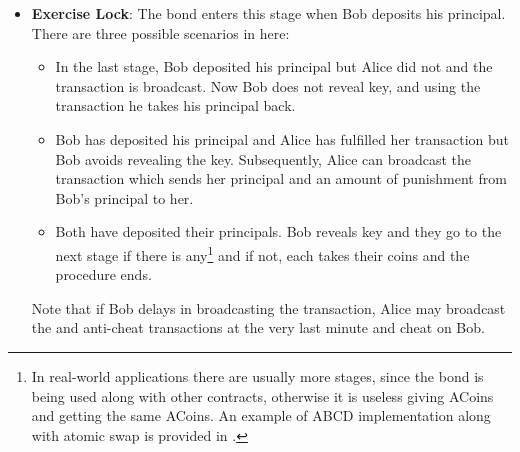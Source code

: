 \begin{itemize}
    \item \textbf{Exercise Lock}: The bond enters this stage when Bob deposits his principal. There are three possible scenarios in here:
    \begin{itemize}
        \item In the last stage, Bob deposited his principal but Alice did not and the  transaction is broadcast. Now Bob does not reveal \keyone key, and using the  transaction he takes his principal back.
        
        \item Bob has deposited his principal and Alice has fulfilled her  transaction but Bob avoids revealing the \keyone key. Subsequently, Alice can broadcast the  transaction which sends her principal and an amount of punishment from Bob's principal to her. 
        
        \item Both have deposited their principals. Bob reveals \keyone key and they go to the next stage if there is any\footnote{In real-world applications there are usually more stages, since the bond is being used along with other contracts, otherwise it is useless giving ACoins and getting the same ACoins. An example of ABCD implementation along with atomic swap is provided in \cite{abcd-ref}.} and if not, each takes their coins and the procedure ends.
    \end{itemize}

    Note that if Bob delays in broadcasting the  transaction, Alice may broadcast the  and anti-cheat transactions at the very last minute and cheat on Bob.
    
   
\end{itemize}

  \new{\eg} 
